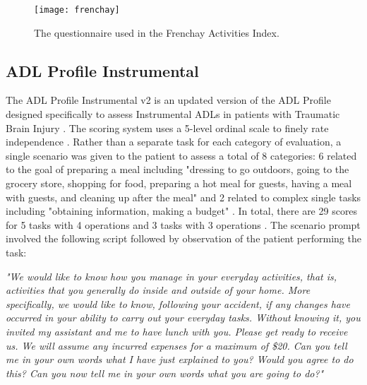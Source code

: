 \begin{figure}[ht]
    \centering
    \texttt{[image: frenchay]}
    \caption{The questionnaire used in the Frenchay Activities Index.}
    \label{fig:frenchay}
\end{figure}

\clearpage
\subsection{ADL Profile Instrumental}
The ADL Profile Instrumental v2 is an updated version of the ADL Profile designed specifically to assess Instrumental ADLs in patients with Traumatic Brain Injury \cite{bottari_iadl_2010}. The scoring system uses a 5-level ordinal scale to finely rate independence \cite{bottari_iadl_2010}. Rather than a separate task for each category of evaluation, a single scenario was given to the patient to assess a total of 8 categories: 6 related to the goal of preparing a meal including "dressing to go outdoors, going to the grocery store, shopping for food, preparing a hot meal for guests, having a meal with guests, and cleaning up after the meal" and 2 related to complex single tasks including "obtaining information, making a budget" \cite{bottari_iadl_2010}. In total, there are 29 scores for 5 tasks with 4 operations and 3 tasks with 3 operations \cite{bottari_iadl_2010}. The scenario prompt involved the following script followed by observation of the patient performing the task:

\begin{displayquote}
    \textit{"We would like to know how you manage in your everyday activities, that is, activities that  you  generally  do  inside and outside  of  your  home. More specifically, we would like to know, following your accident, if any changes have occurred in your ability to carry out your everyday tasks. Without knowing it, you invited my assistant and me to have lunch with you. Please get ready to receive us. We will assume any incurred expenses for a maximum of \$20. Can you tell me in your own words what I have just explained to you? Would you agree to do this? Can you now tell me in your own words what you are going to do?"} \cite{bottari_iadl_2010}
\end{displayquote}



\clearpage

